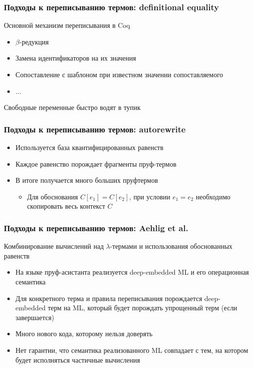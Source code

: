 \documentclass[xcolor=table]{beamer}
\begin{document}
\begin{frame}[fragile]
  \transwipe[direction=90]
  \frametitle{Подходы к переписыванию термов: definitional equality}

\begin{center}
    Основной механизм переписывания в Coq
\end{center}

\begin{itemize}
  \item $\beta$-редукция
  \item Замена идентификаторов на их значения
  \item Сопоставление с шаблоном при известном значении сопоставляемого
  \item $\dots$
\end{itemize}


\begin{center}
  Свободные переменные быстро водят в тупик
\end{center}
\end{frame}

\begin{frame}[fragile]
  \transwipe[direction=90]
  \frametitle{Подходы к переписыванию термов: autorewrite}
\begin{itemize}
  \item Используется база квантифицированных равенств
  \item Каждое равенство порождает фрагменты пруф-термов
  \bigskip
  \item В итоге получается много больших пруфтермов
  \begin{itemize}
    \item Для обоснования $C[e_1] = C[e_2]$, при условии $e_1 = e_2$ необходимо скопировать весь контекст $C$
  \end{itemize}
\end{itemize}
\end{frame}

\begin{frame}[fragile]
  \transwipe[direction=90]
  \frametitle{Подходы к переписыванию термов: Aehlig et al.}
\begin{center}
  Комбинирование вычислений над $\lambda$-термами и использования обоснованных равенств
\end{center}

\begin{itemize}
  \item На языке пруф-асистанта реализуется deep-embedded ML и его операционная семантика
  \item Для конкретного терма и правила переписывания порождается deep-embedded терм на ML, который будет порождать упрощенный терм (если завершается)
  \bigskip
  \item Много нового кода, которому нельзя доверять
  \item Нет гарантии, что семантика реализованного ML совпадает с тем, на котором будет исполняться частичные вычисления
\end{itemize}
\end{frame}
\end{document}
